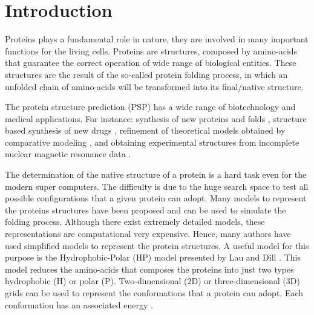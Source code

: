 \documentclass[conference]{IEEEtran}
\begin{document}
\section{Introduction}

%
Proteins plays a fundamental role in nature, they are involved in many important functions for  the living cells. Proteins are structures, composed by amino-acids that guarantee the correct operation of wide range of biological entities. These structures are the result of the so-called protein folding process, in which an unfolded chain of amino-acids will be transformed into its final/native structure.

The protein structure prediction (PSP) has a wide range of biotechnology and medical applications. For instance: synthesis of new proteins and folds \cite{wang2012structural}, structure based synthesis of new drugs \cite{davis2009rosettaligand}, refinement of theoretical models obtained by comparative modeling \cite{qian2004improvement, krieger2009improving}, and
obtaining experimental structures from incomplete nuclear magnetic
resonance data  \cite{shen2009novo}.  

The determination of the native structure of a protein is a hard task even for the modern super computers. The difficulty is due to the huge search space to test all possible configurations that a given protein can adopt. Many models to represent the proteins structures have been proposed and can be used to simulate the folding process. Although there exist extremely detailed models, these representations are computational very expensive. Hence, many authors \cite{custodio2004investigation,hsu2003growth,lin2011protein,unger1993genetic,santana2008component,custodio2014multiple, garza2012locality} have used simplified models to represent the protein structures. A useful model for this purpose is the Hydrophobic-Polar (HP) model presented by Lau and Dill \cite{lau1989lattice}. This model reduces the amino-acids that composes the proteins into just two types hydrophobic (H) or polar (P). Two-dimensional (2D) or three-dimensional (3D) grids can be used to represent the conformations that a protein can adopt. Each conformation has an associated energy \cite{unger1993genetic}. 
\end{document}
